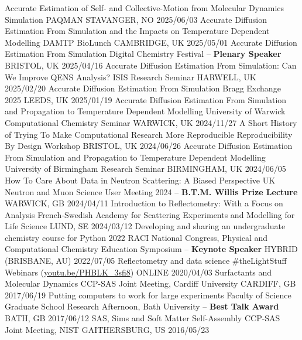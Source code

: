 \vspace{-0.4cm}
\begin{cvhonors}
  \cvhonor
    {Accurate Estimation of Self- and Collective-Motion from Molecular Dynamics Simulation}
    {PAQMAN}
    {STAVANGER, NO}
    {2025/06/03}
  \cvhonor
    {Accurate Diffusion Estimation From Simulation and the Impacts on Temperature Dependent Modelling}
    {DAMTP BioLunch}
    {CAMBRIDGE, UK}
    {2025/05/01}
  \cvhonor
    {Accurate Diffusion Estimation From Simulation}
    {Digital Chemistry Festival -- \textbf{Plenary Speaker}} 
    {BRISTOL, UK}
    {2025/04/16}  
  \cvhonor
    {Accurate Diffusion Estimation From Simulation: Can We Improve QENS Analysis?}
    {ISIS Research Seminar}
    {HARWELL, UK}
    {2025/02/20}
  \cvhonor
    {Accurate Diffusion Estimation From Simulation}
    {Bragg Exchange 2025}
    {LEEDS, UK}
    {2025/01/19}
  \cvhonor
    {Accurate Diffusion Estimation From Simulation and Propagation to Temperature Dependent Modelling}
    {University of Warwick Computational Chemistry Seminar}
    {WARWICK, UK}
    {2024/11/27}
  \cvhonor
    {A Short History of Trying To Make Computational Research More Reproducible}
    {Reproducibility By Design Workshop}
    {BRISTOL, UK}
    {2024/06/26}
  \cvhonor
    {Accurate Diffusion Estimation From Simulation and Propagation to Temperature Dependent Modelling}
    {University of Birmingham Research Seminar}
    {BIRMINGHAM, UK}
    {2024/06/05}
  \cvhonor
    {How To Care About Data in Neutron Scattering: A Biased Perspective}
    {UK Neutron and Muon Science User Meeting 2024 -- \textbf{B.T.M. Willis Prize Lecture}}
    {WARWICK, GB}
    {2024/04/11}
  \cvhonor
    {Introduction to Reflectometry: With a Focus on Analysis}
    {French-Swedish Academy for Scattering Experiments and Modelling for Life Science}
    {LUND, SE}
    {2024/03/12}
  \cvhonor
    {Developing and sharing an undergraduate chemistry course for Python}
    {2022 RACI National Congress, Physical and Computational Chemistry Education Symposium -- \textbf{Keynote Speaker}}
    {HYBRID (BRISBANE, AU)}
    {2022/07/05}
  \cvhonor
    {Reflectometry and data science}
    {\#theLightStuff Webinars (\href{https://youtu.be/PHBLK_3sfi8}{youtu.be/PHBLK\_3sfi8})}
    {ONLINE}
    {2020/04/03}
  \cvhonor
    {Surfactants and Molecular Dynamics}
    {CCP-SAS Joint Meeting, Cardiff University}
    {CARDIFF, GB}
    {2017/06/19}
  \cvhonor
    {Putting computers to work for large experiments}
    {Faculty of Science Graduate School Research Afternoon, Bath University -- \textbf{Best Talk Award}}
    {BATH, GB}
    {2017/06/12}
  \cvhonor
    {SAS, Sims and Soft Matter Self-Assembly}
    {CCP-SAS Joint Meeting, NIST}
    {GAITHERSBURG, US}
    {2016/05/23}
\end{cvhonors}
